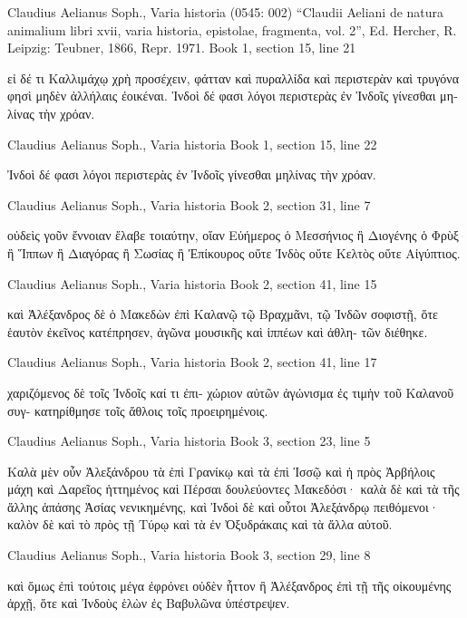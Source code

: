 \documentclass[12pt,letterpaper,twoside,final]{memoir}
\begin{document}
\begin{greek}
Claudius Aelianus Soph., Varia historia (0545: 002)
“Claudii Aeliani de natura animalium libri xvii, varia historia, epistolae, fragmenta, vol. 2”, Ed. Hercher, R.
Leipzig: Teubner, 1866, Repr. 1971.
Book 1, section 15, line 21

                                 εἰ δέ τι Καλλιμάχῳ χρὴ 
προσέχειν, φάτταν καὶ πυραλλίδα καὶ περιστερὰν 
καὶ τρυγόνα φησὶ μηδὲν ἀλλήλαις ἐοικέναι. Ἰνδοὶ δέ 
φασι λόγοι περιστερὰς ἐν Ἰνδοῖς γίνεσθαι μηλίνας 
τὴν χρόαν. 



Claudius Aelianus Soph., Varia historia 
Book 1, section 15, line 22

                                                  Ἰνδοὶ δέ 
φασι λόγοι περιστερὰς ἐν Ἰνδοῖς γίνεσθαι μηλίνας 
τὴν χρόαν. 



Claudius Aelianus Soph., Varia historia 
Book 2, section 31, line 7

                                              οὐδεὶς γοῦν 
ἔννοιαν ἔλαβε τοιαύτην, οἵαν Εὐήμερος ὁ Μεσσήνιος 
ἢ Διογένης ὁ Φρὺξ ἢ Ἵππων ἢ Διαγόρας ἢ Σωσίας 
ἢ Ἐπίκουρος οὔτε Ἰνδὸς οὔτε Κελτὸς οὔτε Αἰγύπτιος. 



Claudius Aelianus Soph., Varia historia 
Book 2, section 41, line 15

         καὶ Ἀλέξανδρος δὲ ὁ Μακεδὼν ἐπὶ Καλανῷ τῷ 
Βραχμᾶνι, τῷ Ἰνδῶν σοφιστῇ, ὅτε ἑαυτὸν ἐκεῖνος 
κατέπρησεν, ἀγῶνα μουσικῆς καὶ ἱππέων καὶ ἀθλη-
τῶν διέθηκε. 



Claudius Aelianus Soph., Varia historia 
Book 2, section 41, line 17

               χαριζόμενος δὲ τοῖς Ἰνδοῖς καί τι ἐπι-
χώριον αὐτῶν ἀγώνισμα ἐς τιμὴν τοῦ Καλανοῦ συγ-
κατηρίθμησε τοῖς ἄθλοις τοῖς προειρημένοις. 



Claudius Aelianus Soph., Varia historia 
Book 3, section 23, line 5

Καλὰ μὲν οὖν Ἀλεξάνδρου τὰ ἐπὶ Γρανίκῳ καὶ 
τὰ ἐπὶ Ἰσσῷ καὶ ἡ πρὸς Ἀρβήλοις μάχη καὶ Δαρεῖος 
ἡττημένος καὶ Πέρσαι δουλεύοντες Μακεδόσι· καλὰ 
δὲ καὶ τὰ τῆς ἄλλης ἁπάσης Ἀσίας νενικημένης, καὶ 
Ἰνδοὶ δὲ καὶ οὗτοι Ἀλεξάνδρῳ πειθόμενοι· καλὸν δὲ 
καὶ τὸ πρὸς τῇ Τύρῳ καὶ τὰ ἐν Ὀξυδράκαις καὶ τὰ 
ἄλλα αὐτοῦ. 



Claudius Aelianus Soph., Varia historia 
Book 3, section 29, line 8

καὶ ὅμως ἐπὶ τούτοις μέγα ἐφρόνει οὐδὲν ἧττον ἢ 
Ἀλέξανδρος ἐπὶ τῇ τῆς οἰκουμένης ἀρχῇ, ὅτε καὶ 
Ἰνδοὺς ἑλὼν ἐς Βαβυλῶνα ὑπέστρεψεν. 




\end{greek}
\end{document}
